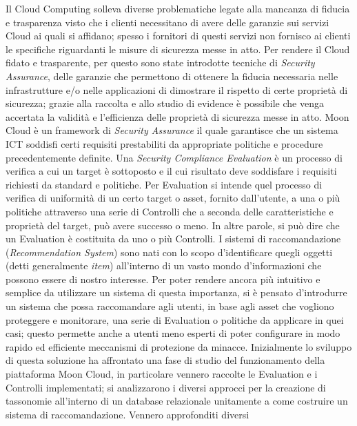 \documentclass[10pt,a4paper]{article}
\begin{document}
\hfill\break
Il Cloud Computing solleva diverse problematiche legate alla mancanza di fiducia e trasparenza visto che i clienti necessitano di avere delle 
garanzie sui servizi Cloud ai quali si affidano; spesso i fornitori di questi servizi non fornisco ai clienti le specifiche riguardanti le misure 
di sicurezza messe in atto.\hfill\break
Per rendere il Cloud fidato e trasparente, per questo sono state introdotte tecniche di \textit{Security Assurance}, delle garanzie che 
permettono di ottenere la fiducia necessaria nelle infrastrutture e/o nelle applicazioni di dimostrare il rispetto di certe proprietà 
di sicurezza; grazie alla raccolta e allo studio di evidence è possibile che venga accertata la validità e l'efficienza delle proprietà di 
sicurezza messe in atto.\hfill\break
Moon Cloud è un framework di \textit{Security Assurance} il quale garantisce che un sistema ICT soddisfi certi requisiti 
prestabiliti da appropriate politiche e procedure precedentemente definite. Una \textit{Security Compliance Evaluation} è un processo di 
verifica a cui un target è sottoposto e il cui risultato deve soddisfare i requisiti richiesti da standard e politiche. 
Per Evaluation si intende quel processo di verifica di uniformità di un certo target o asset, fornito dall'utente, a una o più politiche 
attraverso una serie di Controlli che a seconda delle caratteristiche e proprietà del target, può avere successo o meno. In altre parole, 
si può dire che un Evaluation è costituita da uno o più Controlli.\hfill\break
I sistemi di raccomandazione (\textit{Recommendation System}) sono nati con lo scopo d'identificare quegli oggetti (detti generalmente \textit{item}) 
all'interno di un vasto mondo d'informazioni che possono essere di nostro interesse.\hfill\break
Per poter rendere ancora più intuitivo e semplice da utilizzare un sistema di questa importanza, si è pensato d'introdurre un sistema che 
possa raccomandare agli utenti, in base agli asset che vogliono proteggere e monitorare, una serie di Evaluation o politiche da applicare in quei casi; 
questo permette anche a utenti meno esperti di poter configurare in modo rapido ed efficiente meccanismi di protezione da minacce.\hfill\break
Inizialmente lo sviluppo di questa soluzione ha affrontato una fase di studio del funzionamento della piattaforma Moon Cloud, 
in particolare vennero raccolte le Evaluation e i Controlli implementati; si analizzarono i diversi approcci 
per la creazione di tassonomie all'interno di un database relazionale unitamente a come costruire un sistema di raccomandazione. Vennero approfonditi diversi 
\end{document}
